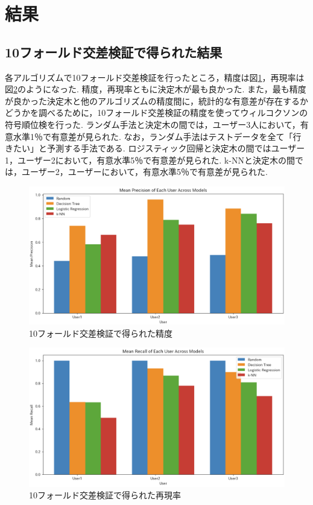 \documentclass[12pt,a4j]{jreport}
\begin{document}
\section{結果}
\subsection{10フォールド交差検証で得られた結果}
各アルゴリズムで10フォールド交差検証を行ったところ，精度は図\ref{fig7}，再現率は図\ref{fig8}のようになった.
精度，再現率ともに決定木が最も良かった.
また，最も精度が良かった決定木と他のアルゴリズムの精度間に，統計的な有意差が存在するかどうかを調べるために，10フォールド交差検証の精度を使ってウィルコクソンの符号順位検を行った.
ランダム手法と決定木の間では，ユーザー3人において，有意水準1％で有意差が見られた.
なお，ランダム手法はテストデータを全て「行きたい」と予測する手法である.
ロジスティック回帰と決定木の間ではユーザー1，ユーザー2において，有意水準5％で有意差が見られた.
k-NNと決定木の間では，ユーザー2，ユーザーにおいて，有意水準5％で有意差が見られた.

\begin{figure}[htbp]
  \begin{center}
    \includegraphics[width=14cm]{image/fig7.png}
    \caption{10フォールド交差検証で得られた精度}
    \label{fig7}
  \end{center}
\end{figure}

\begin{figure}[htbp]
  \begin{center}
    \includegraphics[width=14cm]{image/fig8.png}
    \caption{10フォールド交差検証で得られた再現率}
    \label{fig8}
  \end{center}
\end{figure}
\end{document}
